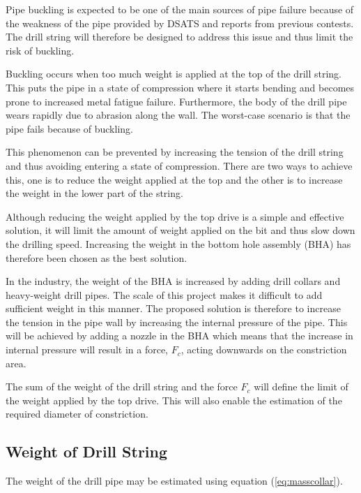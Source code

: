 

Pipe buckling is expected to be one of the main sources of pipe failure because of the weakness of the pipe provided by DSATS \cite{dsats} and reports from previous contests. The drill string will therefore be designed to address this issue and thus limit the risk of buckling.

Buckling occurs when too much weight is applied at the top of the drill string. This puts the pipe in a state of compression where it starts bending and becomes prone to increased metal fatigue failure. Furthermore, the body of the drill pipe wears rapidly due to abrasion along the wall. The worst-case scenario is that the pipe fails because of buckling.

This phenomenon can be prevented by increasing the tension of the drill string and thus avoiding entering a state of compression. There are two ways to achieve this, one is to reduce the weight applied at the top and the other is to increase the weight in the lower part of the string.

Although reducing the weight applied by the top drive is a simple and effective solution, it will limit the amount of weight applied on the bit and thus slow down the drilling speed. Increasing the weight in the bottom hole assembly (BHA) has therefore been chosen as the best solution.

In the industry, the weight of the BHA is increased by adding drill collars and heavy-weight drill pipes. The scale of this project makes it difficult to add sufficient weight in this manner. The proposed solution is therefore to increase the tension in the pipe wall by increasing the internal pressure of the pipe. This will be achieved by adding a nozzle in the BHA which means that the increase in internal pressure will result in a force, $F_c$, acting downwards on the constriction area. 

The sum of the weight of the drill string and the force $F_c$ will define the limit of the weight applied by the top drive. This will also enable the estimation of the required diameter of constriction.

\subsection{Weight of Drill String}
    
The weight of the drill pipe may be estimated using equation (\ref{eq:masscollar}).

